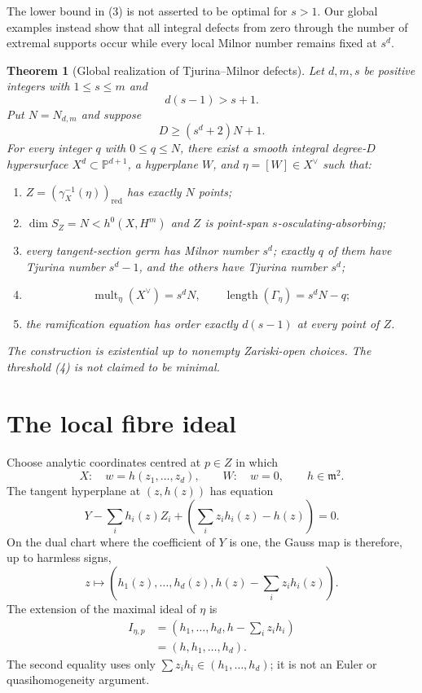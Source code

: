 \documentclass[11pt,a4paper]{article}
\newtheorem{theorem}{Theorem}[section]
\theoremstyle{definition}
\newcommand{\PP}{\mathbb P}
\newcommand{\m}{\mathfrak m}
\newcommand{\mult}{\operatorname{mult}}
\newcommand{\length}{\operatorname{length}}
\begin{document}
The lower bound in (3) is not asserted to be optimal for $s>1$.  Our global
examples instead show that all integral defects from zero through the number
of extremal supports occur while every local Milnor number remains fixed at
$s^d$.

\begin{theorem}[Global realization of Tjurina--Milnor defects]\label{thm:realization}
Let $d,m,s$ be positive integers with $1\le s\le m$ and
\[
 d(s-1)>s+1.
\]
Put $N=N_{d,m}$ and suppose
\[
 D\ge (s^d+2)N+1.                                      \tag{4}
\]
For every integer $q$ with $0\le q\le N$, there exist a smooth integral
degree-$D$ hypersurface $X^d\subset\PP^{d+1}$, a hyperplane $W$, and
$\eta=[W]\in X^\vee$ such that:
\begin{enumerate}
\item $Z=(\gamma_X^{-1}(\eta))_{\mathrm{red}}$ has exactly $N$ points;
\item $\dim S_Z=N< h^0(X,H^m)$ and $Z$ is point-span
      $s$-osculating-absorbing;
\item every tangent-section germ has Milnor number $s^d$; exactly $q$ of
      them have Tjurina number $s^d-1$, and the others have Tjurina number
      $s^d$;
\item
\[
 \mult_\eta(X^\vee)=s^dN,
 \qquad \length(\Gamma_\eta)=s^dN-q;
\]
\item the ramification equation has order exactly $d(s-1)$ at every point
      of $Z$.
\end{enumerate}
The construction is existential up to nonempty Zariski-open choices.  The
threshold \emph{(4)} is not claimed to be minimal.
\end{theorem}

\section{The local fibre ideal}\label{sec:local}

Choose analytic coordinates centred at $p\in Z$ in which
\[
 X:\quad w=h(z_1,\ldots,z_d),
 \qquad W:\quad w=0,
 \qquad h\in\m^2.
\]
The tangent hyperplane at $(z,h(z))$ has equation
\[
 Y-\sum_i h_i(z)Z_i+\left(\sum_i z_i h_i(z)-h(z)\right)=0.
\]
On the dual chart where the coefficient of $Y$ is one, the Gauss map is
therefore, up to harmless signs,
\[
 z\longmapsto\left(h_1(z),\ldots,h_d(z),
 h(z)-\sum_i z_i h_i(z)\right).                         \tag{5}
\]
The extension of the maximal ideal of $\eta$ is
\begin{align*}
 I_{\eta,p}
 &=\left(h_1,\ldots,h_d,h-\sum_i z_i h_i\right)\\
 &=\left(h,h_1,\ldots,h_d\right).                       \tag{6}
\end{align*}
The second equality uses only $\sum z_i h_i\in(h_1,\ldots,h_d)$; it is not
an Euler or quasihomogeneity argument.
\end{document}
